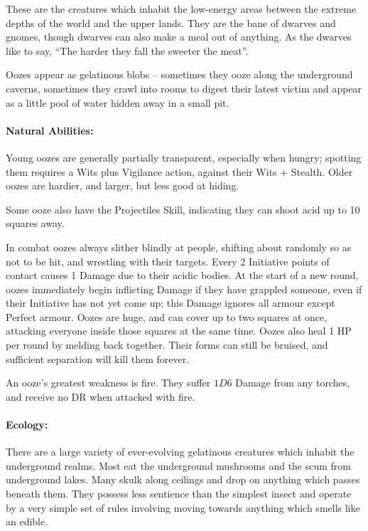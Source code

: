 \begin{multicols}{2}

These are the creatures which inhabit the low-energy areas between the extreme depths of the world and the upper lands.
They are the bane of dwarves and gnomes, though dwarves can also make a meal out of anything.
As the dwarves like  to say, ``The harder they fall the sweeter the meat''.

\label{ooze}
Oozes appear as gelatinous blobs -- sometimes they ooze along the underground caverns, sometimes they crawl into rooms to digest their latest victim and appear as a little pool of water hidden away in a small pit.

\paragraph{Natural Abilities:} Young oozes are generally partially transparent, especially when hungry; spotting them requires a Wits plus Vigilance action, against their Wits + Stealth.
Older oozes are hardier, and larger, but less good at hiding.

Some ooze also have the Projectiles Skill, indicating they can shoot acid up to 10 squares away.

In combat oozes always slither blindly at people, shifting about randomly so as not to be hit, and wrestling with their targets.
Every 2 Initiative points of contact causes 1 Damage due to their acidic bodies.
At the start of a new round, oozes immediately begin inflicting Damage if they have grappled someone, even if their Initiative has not yet come up; this Damage ignores all armour except Perfect armour.
Oozes are huge, and can cover up to two squares at once, attacking everyone inside those squares at the same time.
Oozes also heal 1 HP per round by melding back together.
Their forms can still be bruised, and sufficient separation will kill them forever.

An ooze's greatest weakness is fire.
They suffer $1D6$ Damage from any torches, and receive no DR when attacked with fire.

\paragraph{Ecology:} There are a large variety of ever-evolving gelatinous creatures which inhabit the underground realms.  Most eat the underground mushrooms and the scum from underground lakes.  Many skulk along ceilings and drop on anything which passes beneath them.  They possess less sentience than the simplest insect and operate by a very simple set of rules involving moving towards anything which smells like an edible.


\end{multicols}
